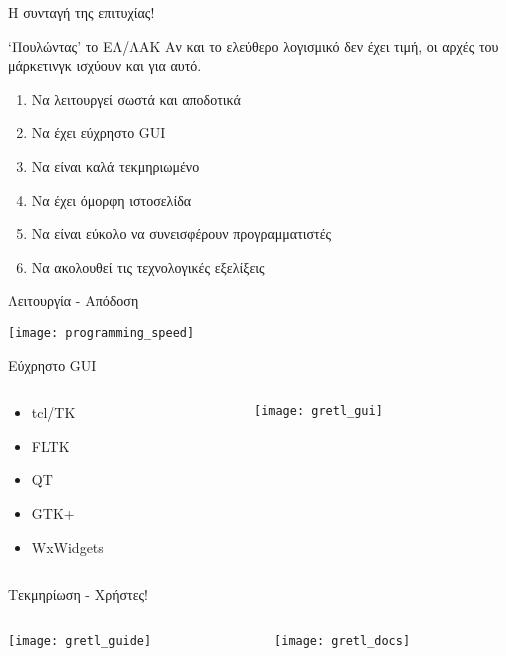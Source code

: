 \documentclass[xetex]{beamer}
\begin{document}
\begin{frame}{Η συνταγή της επιτυχίας!}
    \begin{block}{`Πουλώντας' το ΕΛ/ΛΑΚ}
    Αν και το ελεύθερο λογισμικό δεν έχει τιμή, οι αρχές του μάρκετινγκ ισχύουν και για αυτό.
    \end{block}
    \pause
    \begin{enumerate}
    \item Να λειτουργεί σωστά και αποδοτικά \pause \cmark
    \item Να έχει εύχρηστο GUI \pause \cmark
    \item Να είναι καλά τεκμηριωμένο \pause \cmark
    \item Να έχει όμορφη ιστοσελίδα \pause \xmark
    \item Να είναι εύκολο να συνεισφέρουν προγραμματιστές \pause \xmark
    \item Να ακολουθεί τις τεχνολογικές εξελίξεις \pause \xmark
    \end{enumerate}
\end{frame}

\begin{frame}{Λειτουργία - Απόδοση}
	\begin{center}
	\texttt{[image: programming\_speed]}
	\end{center}
\end{frame}

\begin{frame}{Εύχρηστο GUI}
   \begin{columns}
    \begin{column}{.3\textwidth}
     	\begin{itemize}
		\item tcl/TK
		\item FLTK
		\item QT
		\item GTK+
		\item WxWidgets
		\end{itemize}
    \end{column}
    \begin{column}{.7\textwidth}
     \texttt{[image: gretl\_gui]}
    \end{column}
   \end{columns}
\end{frame}

\begin{frame}{Τεκμηρίωση - Χρήστες!}
	\begin{columns}
    \begin{column}{.5\textwidth}
		\texttt{[image: gretl\_guide]}
    \end{column}
    \begin{column}{.5\textwidth}
    	\texttt{[image: gretl\_docs]}
    \end{column}
   \end{columns}
\end{frame}
\end{document}
